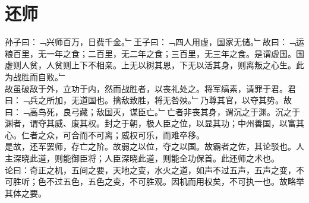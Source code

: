 \chapter{还师}%
孙子曰：﹁兴师百万，日费千金。﹂王子曰：﹁四人用虚，国家无储。﹂故曰：﹁运粮百里，无一年之食；二百里，无二年之食；三百里，无三年之食。是谓虚国。国虚则人贫，人贫则上下不相亲。上无以树其恩，下无以活其身，则离叛之心生。此为战胜而自败。﹂\\
故虽破敌于外，立功于内，然而战胜者，以丧礼处之。将军缟素，请罪于君。君曰：﹁兵之所加，无道国也。擒敌致胜，将无咎殃。﹂乃尊其官，以夺其势。故曰：﹁高鸟死，良弓藏；敌国灭，谋臣亡。﹂亡者非丧其身，谓沉之于渊。沉之于渊者，谓夺其威、废其权。封之于朝，极人臣之位，以显其功；中州善国，以富其心。仁者之众，可合而不可离；威权可乐，而难卒移。\\
是故，还军罢师，存亡之阶。故弱之以位，夺之以国。故霸者之佐，其论驳也。人主深晓此道，则能御臣将；人臣深晓此道，则能全功保首。此还师之术也。\\
论曰：奇正之机，五间之要，天地之变，水火之道，如声不过五声，五声之变，不可胜听；色不过五色，五色之变，不可胜观。因机而用权矣，不可执一也。故略举其体之要。

